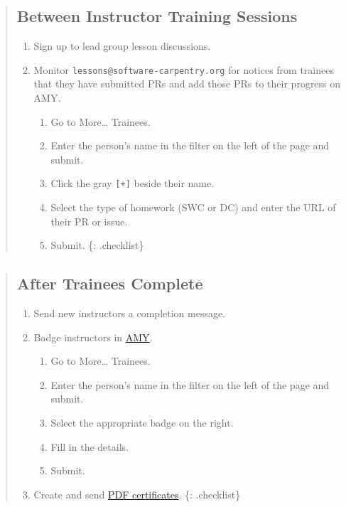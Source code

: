 \begin{quote}
\subsection{Between Instructor Training
Sessions}\label{between-instructor-training-sessions}

\begin{enumerate}
\def\labelenumi{\arabic{enumi}.}
\itemsep1pt\parskip0pt
\item
  Sign up to lead group lesson discussions.
\item
  Monitor \texttt{lessons@software-carpentry.org} for notices from
  trainees that they have submitted PRs and add those PRs to their
  progress on AMY.

  \begin{enumerate}
  \def\labelenumii{\arabic{enumii}.}
  \itemsep1pt\parskip0pt
  \item
    Go to More\ldots{} Trainees.
  \item
    Enter the person's name in the filter on the left of the page and
    submit.
  \item
    Click the gray \texttt{{[}+{]}} beside their name.
  \item
    Select the type of homework (SWC or DC) and enter the URL of their
    PR or issue.
  \item
    Submit. \{: .checklist\}
  \end{enumerate}
\end{enumerate}
\end{quote}

\begin{quote}
\subsection{After Trainees Complete}\label{after-trainees-complete}

\begin{enumerate}
\def\labelenumi{\arabic{enumi}.}
\itemsep1pt\parskip0pt
\item
  Send new instructors
  a completion message.
\item
  Badge instructors in \href{\{\{\%20site.amy\_site\%20\}\}/}{AMY}.

  \begin{enumerate}
  \def\labelenumii{\arabic{enumii}.}
  \itemsep1pt\parskip0pt
  \item
    Go to More\ldots{} Trainees.
  \item
    Enter the person's name in the filter on the left of the page and
    submit.
  \item
    Select the appropriate badge on the right.
  \item
    Fill in the details.
  \item
    Submit.
  \end{enumerate}
\item
  Create and send
  \href{\{\{\%20site.swc\_github\%20\}\}/certification}{PDF
  certificates}. \{: .checklist\}
\end{enumerate}
\end{quote}

